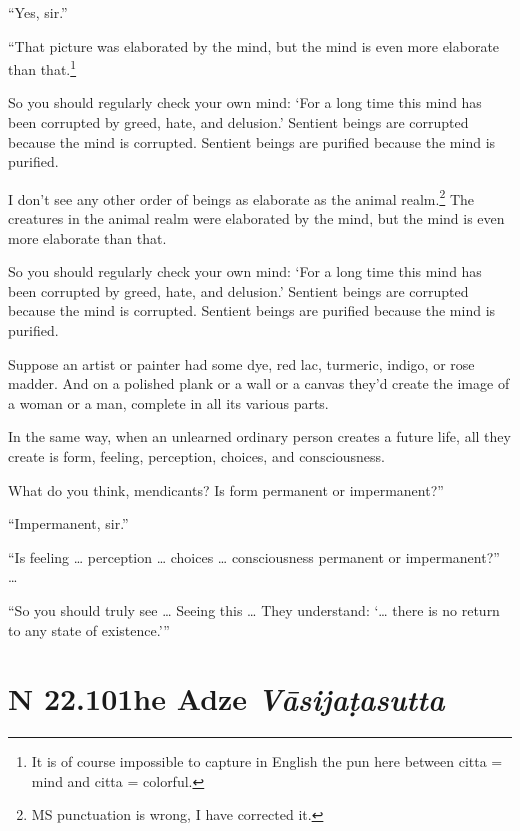 \documentclass[12pt,openany]{book}%
\newcommand*{\suttatitleacronym}[1]{\smaller[2]{#1}\vspace*{.3em}}
\newcommand*{\suttatitletranslation}[1]{\linebreak{#1}}
\newcommand*{\suttatitleroot}[1]{\linebreak\smaller[2]\itshape{#1}}
\newcommand*{\tocacronym}[1]{\hspace*{-3.3em}{#1}\quad}
\newcommand*{\toctranslation}[1]{#1}
\newcommand*{\tocroot}[1]{(\textit{#1})}
\begin{document}
“Yes, sir.” 

“That picture was elaborated by the mind, but the mind is even more elaborate than that.\footnote{It is of course impossible to capture in English the pun here between citta = mind and citta = colorful. } 

So you should regularly check your own mind: ‘For a long time this mind has been corrupted by greed, hate, and delusion.’ Sentient beings are corrupted because the mind is corrupted. Sentient beings are purified because the mind is purified. 

I don’t see any other order of beings as elaborate as the animal realm.\footnote{MS punctuation is wrong, I have corrected it. } The creatures in the animal realm were elaborated by the mind, but the mind is even more elaborate than that. 

So you should regularly check your own mind: ‘For a long time this mind has been corrupted by greed, hate, and delusion.’ Sentient beings are corrupted because the mind is corrupted. Sentient beings are purified because the mind is purified. 

Suppose an artist or painter had some dye, red lac, turmeric, indigo, or rose madder. And on a polished plank or a wall or a canvas they’d create the image of a woman or a man, complete in all its various parts. 

In the same way, when an unlearned ordinary person creates a future life, all they create is form, feeling, perception, choices, and consciousness. 

What do you think, mendicants? Is form permanent or impermanent?” 

“Impermanent, sir.” 

“Is feeling … perception … choices … consciousness permanent or impermanent?” … 

“So you should truly see … Seeing this … They understand: ‘… there is no return to any state of existence.’” 

%
\section*{{\suttatitleacronym SN 22.101}{\suttatitletranslation The Adze }{\suttatitleroot Vāsijaṭasutta}}
\addcontentsline{toc}{section}{\tocacronym{SN 22.101} \toctranslation{The Adze } \tocroot{Vāsijaṭasutta}}
\end{document}
